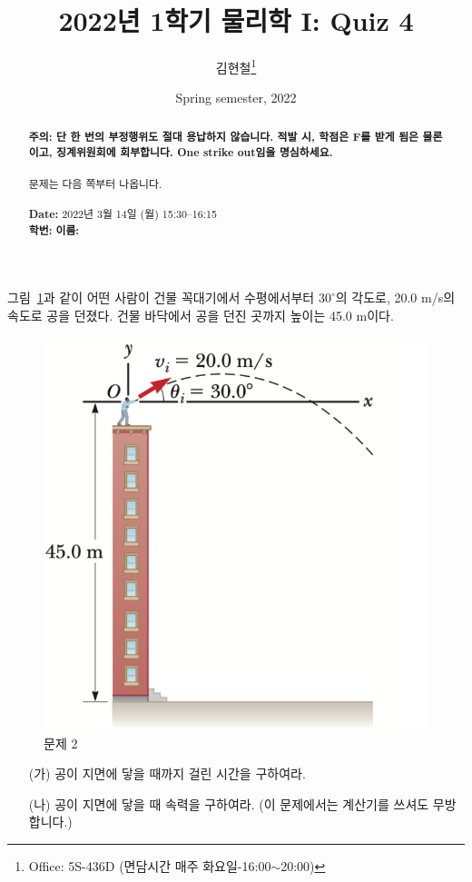 \documentclass[floatfix,nofootinbib,superscriptaddress,fleqn,preprint]{revtex4}
\begin{document}
\title{\Large 2022년 1학기 물리학 I: Quiz 4}
\author{김현철\footnote{Office: 5S-436D (면담시간 매주
    화요일-16:00$\sim$20:00)}} 
\date{Spring semester, 2022}


\vspace{1.cm}
\begin{abstract}
\noindent \textbf{ {\color{red}주의}: \color{blue} 단 한 번의 부정행위도 절대
  용납하지 않습니다. 적발 시, 학점은 F를 받게 됨은 물론이고,
  징계위원회에 회부합니다. One strike out임을 명심하세요.}\\
\\
문제는 다음 쪽부터 나옵니다.  \\ \\
{\bf Date:} 2022년 3월 14일 (월) 15:30--16:15
\\
{\bf 학번:} \hspace{4cm}
{\bf 이름:} 

\end{abstract}
\maketitle

그림~\ref{fig:1}과 같이 어떤 사람이 건물
꼭대기에서 수평에서부터 $30^\circ$의 각도로, 20.0 m/s의 속도로
공을 던졌다. 건물 
바닥에서 공을 던진 곳까지 높이는 45.0 m이다. 
\begin{figure}[ht]
  \centering
\includegraphics[scale=0.6]{Qfig4-2.pdf}  
  \caption{문제 2}
  \label{fig:1}
\end{figure}
\begin{itemize}
\item[(가)] 공이 지면에 닿을 때까지 걸린 시간을 구하여라.
\item[(나)] 공이 지면에 닿을 때 속력을 구하여라. (이 문제에서는 계산기를
  쓰셔도 무방합니다.)
\end{itemize}
\end{document}
